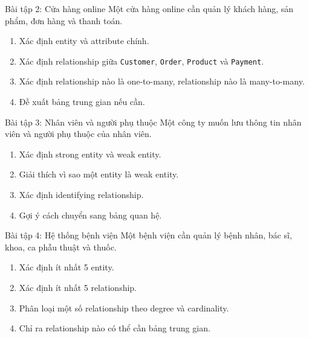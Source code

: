 \documentclass[aspectratio=169,11pt]{beamer}
\newcommand{\smallitem}{\setlength{\itemsep}{2pt}\setlength{\parskip}{0pt}}
\begin{document}
\begin{frame}{Bài tập 2: Cửa hàng online}
\small
Một cửa hàng online cần quản lý khách hàng, sản phẩm, đơn hàng và thanh toán.

\vspace{2mm}
\begin{enumerate}
\smallitem
  \item Xác định entity và attribute chính.
  \item Xác định relationship giữa \texttt{Customer}, \texttt{Order}, \texttt{Product} và \texttt{Payment}.
  \item Xác định relationship nào là one-to-many, relationship nào là many-to-many.
  \item Đề xuất bảng trung gian nếu cần.
\end{enumerate}
\end{frame}

\begin{frame}{Bài tập 3: Nhân viên và người phụ thuộc}
\small
Một công ty muốn lưu thông tin nhân viên và người phụ thuộc của nhân viên.

\vspace{2mm}
\begin{enumerate}
\smallitem
  \item Xác định strong entity và weak entity.
  \item Giải thích vì sao một entity là weak entity.
  \item Xác định identifying relationship.
  \item Gợi ý cách chuyển sang bảng quan hệ.
\end{enumerate}
\end{frame}

\begin{frame}{Bài tập 4: Hệ thống bệnh viện}
\small
Một bệnh viện cần quản lý bệnh nhân, bác sĩ, khoa, ca phẫu thuật và thuốc.

\vspace{2mm}
\begin{enumerate}
\smallitem
  \item Xác định ít nhất 5 entity.
  \item Xác định ít nhất 5 relationship.
  \item Phân loại một số relationship theo degree và cardinality.
  \item Chỉ ra relationship nào có thể cần bảng trung gian.
\end{enumerate}
\end{frame}
\end{document}
